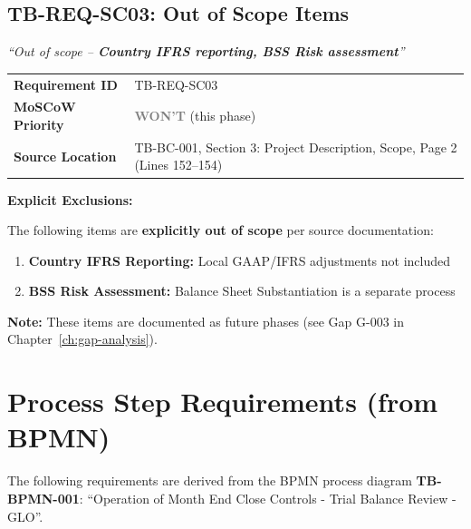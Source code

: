 \subsection{TB-REQ-SC03: Out of Scope Items}
\label{req:tb-req-sc03}

\begin{tcolorbox}[colback=sourcegreen!5,colframe=sourcegreen!70,title=Source Quotation]
\textit{``Out of scope – \textbf{Country IFRS reporting, BSS Risk assessment}''}
\end{tcolorbox}

\begin{tabularx}{\textwidth}{@{}lX@{}}
\toprule
\textbf{Requirement ID} & TB-REQ-SC03 \\
\textbf{MoSCoW Priority} & \textcolor{gray}{\textbf{WON'T}} (this phase) \\
\textbf{Source Location} & TB-BC-001, Section 3: Project Description, Scope, Page 2 (Lines 152--154) \\
\bottomrule
\end{tabularx}

\vspace{0.5em}
\textbf{Explicit Exclusions:}

The following items are \textbf{explicitly out of scope} per source documentation:

\begin{enumerate}
    \item \textbf{Country IFRS Reporting:} Local GAAP/IFRS adjustments not included
    \item \textbf{BSS Risk Assessment:} Balance Sheet Substantiation is a separate process
\end{enumerate}

\textbf{Note:} These items are documented as future phases (see Gap G-003 in Chapter~\ref{ch:gap-analysis}).

\section{Process Step Requirements (from BPMN)}
\label{sec:req-process}

The following requirements are derived from the BPMN process diagram 
\textbf{TB-BPMN-001}: ``Operation of Month End Close Controls - Trial Balance 
Review - GLO''.

